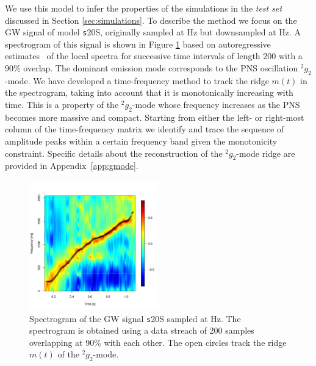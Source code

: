 {We use this model to infer the properties of the simulations in the 
{\it test set} discussed in Section \ref{sec:simulations}.}
To describe the method we focus on the GW signal
of model {\texttt s20S}, originally
sampled at \unit[16384]{Hz} but downsampled at \unit[4096]{Hz}.
A spectrogram of this signal is shown in Figure \ref{fig:spectrogram} based on
autoregressive estimates~\citep{BrockwellPeterJ1991Tsta} of the local spectra for successive time intervals of length 200 with a 90\% overlap.
The dominant emission mode corresponds to the PNS oscillation $\mbox{}^2 g_2$-mode. We have
developed a time-frequency method to track the ridge $m(t) $ in the spectrogram,
taking into account that it is monotonically increasing with time. 
This is a property of the $\mbox{}^2 g_2$-mode whose frequency   
increases as the PNS becomes more massive and compact.
Starting from either the left- or right-most column of the time-frequency matrix
we identify and trace the sequence of amplitude peaks within a certain frequency
band given the monotonicity constraint. Specific details about the reconstruction of the $\mbox{}^2 g_2$-mode ridge 
are provided in Appendix~\ref{app:gmode}. 

\begin{figure}
 \centering
 \includegraphics[width=0.5\textwidth]{plots/spectrogram}
 \caption{Spectrogram of the GW signal {\texttt s20S} sampled at \unit[4096]{Hz}.
   The spectrogram is obtained using a data streach of 200 samples overlapping at 90\%
   with each other. The open circles track the ridge $m(t) $ of the $\mbox{}^2 g_2$-mode. } \label{fig:spectrogram}
\end{figure}

